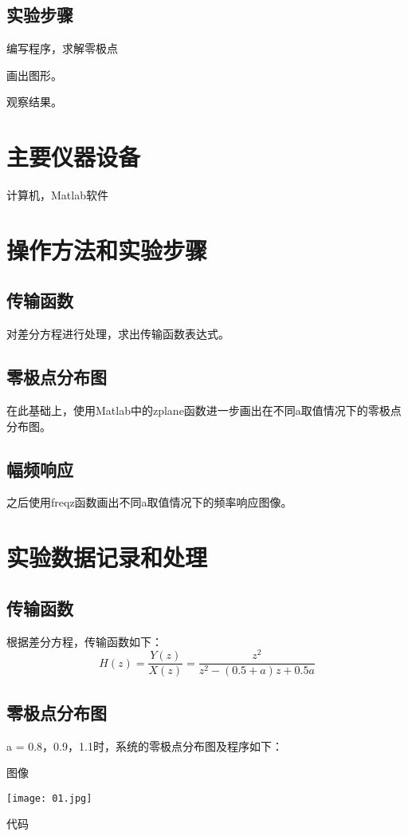 \documentclass[withcover]{zjureport}
\begin{document}
  \subsection{实验步骤}
    \begin{clause}
      \item 编写程序，求解零极点
      \item 画出图形。
      \item 观察结果。
    \end{clause}

\section{主要仪器设备}
  计算机，Matlab软件

\section{操作方法和实验步骤}
  \subsection{传输函数}
    对差分方程进行处理，求出传输函数表达式。
  \subsection{零极点分布图}
    在此基础上，使用Matlab中的zplane函数进一步画出在不同a取值情况下的零极点分布图。
  \subsection{幅频响应}
    之后使用freqz函数画出不同a取值情况下的频率响应图像。

\section{实验数据记录和处理}
  \subsection{传输函数}
    根据差分方程，传输函数如下：
    $$H(z) = \frac{Y(z)}{X(z)} = \frac{z^2}{z^2-(0.5+a)z+0.5a}$$
  \subsection{零极点分布图}
    a = 0.8，0.9，1.1时，系统的零极点分布图及程序如下：
    \begin{clause}
      \item 图像
      \begin{center}
        \texttt{[image: 01.jpg]}
      \end{center}
      \item 代码
      
    \end{clause}
\end{document}
